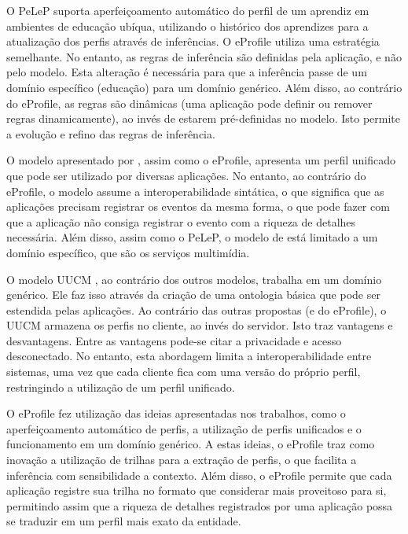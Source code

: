 
O PeLeP \cite{pelep} suporta aperfeiçoamento automático do perfil de um aprendiz em ambientes de educação ubíqua, utilizando o histórico dos aprendizes para a atualização dos perfis através de inferências. O eProfile utiliza uma estratégia semelhante. No entanto, as regras de inferência são definidas pela aplicação, e não pelo modelo. Esta alteração é necessária para que a inferência passe de um domínio específico (educação) para um domínio genérico. Além disso, ao contrário do eProfile, as regras são dinâmicas (uma aplicação pode definir ou remover regras dinamicamente), ao invés de estarem pré-definidas no modelo. Isto permite a evolução e refino das regras de inferência.

O modelo apresentado por , assim como o eProfile, apresenta um perfil unificado que pode ser utilizado por diversas aplicações. No entanto, ao contrário do eProfile, o modelo assume a interoperabilidade sintática, o que significa que as aplicações precisam registrar os eventos da mesma forma, o que pode fazer com que a aplicação não consiga registrar o evento com a riqueza de detalhes necessária. Além disso, assim como o PeLeP, o modelo de  está limitado a um domínio específico, que são os serviços multimídia.

O modelo UUCM \cite{niederee04}, ao contrário dos outros modelos, trabalha em um domínio genérico. Ele faz isso através da criação de uma ontologia básica que pode ser estendida pelas aplicações. Ao contrário das outras propostas (e do eProfile), o UUCM armazena os perfis no cliente, ao invés do servidor. Isto traz vantagens e desvantagens. Entre as vantagens pode-se citar a privacidade e acesso desconectado. No entanto, esta abordagem limita a interoperabilidade entre sistemas, uma vez que cada cliente fica com uma versão do próprio perfil, restringindo a utilização de um perfil unificado.

O eProfile fez utilização das ideias apresentadas nos trabalhos, como o aperfeiçoamento automático de perfis, a utilização de perfis unificados e o funcionamento em um domínio genérico. A estas ideias, o eProfile traz como inovação a utilização de trilhas para a extração de perfis, o que facilita a inferência com sensibilidade a contexto. Além disso, o eProfile permite que cada aplicação registre sua trilha no formato que considerar mais proveitoso para si, permitindo assim que a riqueza de detalhes registrados por uma aplicação possa se traduzir em um perfil mais exato da entidade.

